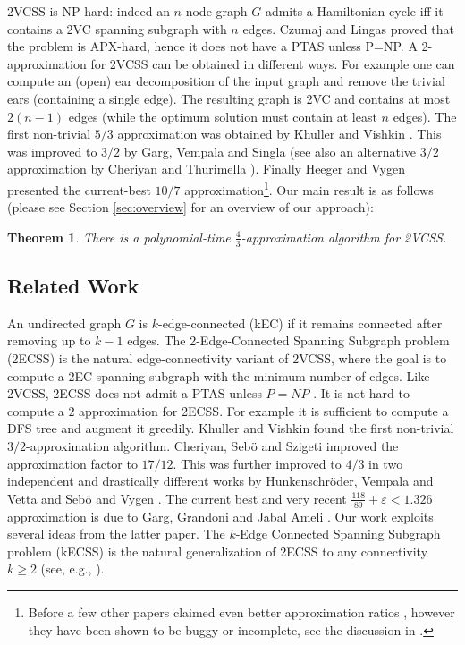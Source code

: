 \documentclass{article}
\newtheorem{theorem}{Theorem}\newtheorem{lemma}[theorem]{Lemma}\newtheorem{proposition}[theorem]{Proposition}\newtheorem{corollary}[theorem]{Corollary}\newtheorem{definition}[theorem]{Definition}\newtheorem{claim}[theorem]{Claim}\newtheorem{remark}[theorem]{Remark}\newtheorem{observation}[theorem]{Observation}\newtheorem{conjecture}[theorem]{Conjecture}\newtheorem{example}[theorem]{Example}
\newcommand{\eps}{\varepsilon}
\begin{document}
2VCSS is NP-hard: indeed an $n$-node graph $G$ admits a Hamiltonian cycle iff it contains a 2VC spanning subgraph with $n$ edges. Czumaj and Lingas \cite{CL99} proved that the problem is APX-hard, hence it does not have a PTAS unless P=NP. A 2-approximation for 2VCSS can be obtained in different ways. For example one can compute an (open) ear decomposition of the input graph and remove the trivial ears (containing a single edge). The resulting graph is 2VC and contains at most $2(n-1)$ edges (while the optimum solution must contain at least $n$ edges). 
The first non-trivial $5/3$ approximation was obtained by Khuller and Vishkin \cite{KV94}. This was improved to $3/2$ by Garg, Vempala and Singla \cite{GVS93} (see also an alternative $3/2$ approximation by Cheriyan and Thurimella \cite{CT00}). Finally Heeger and Vygen \cite{HV17} presented the current-best $10/7$ approximation\footnote{Before \cite{HV17} a few other papers claimed even better approximation ratios \cite{GR05,JRV03}, however they have been shown to be buggy or incomplete, see the discussion in \cite{HV17}.}. Our main result is as follows (please see Section \ref{sec:overview} for an overview of our approach):   
\begin{theorem}\label{thm:mainTheorem}
There is a polynomial-time $\frac{4}{3}$-approximation algorithm for 2VCSS.    
\end{theorem}

\subsection{Related Work}

An undirected graph $G$ is $k$-edge-connected (kEC) if it remains connected after removing up to $k-1$ edges. The 2-Edge-Connected Spanning Subgraph problem (2ECSS) is the natural edge-connectivity variant of 2VCSS, where the goal is to compute a 2EC spanning subgraph with the minimum number of edges. Like 2VCSS, 2ECSS does not admit a PTAS unless $P=NP$ \cite{CL99}. It is not hard to compute a $2$ approximation for 2ECSS. For example it is sufficient to compute a DFS tree and augment it greedily. Khuller and Vishkin \cite{KV92} found the first non-trivial $3/2$-approximation algorithm. Cheriyan, Seb{\"{o}} and Szigeti \cite{CSS01} improved the approximation factor to $17/12$. This was further improved to $4/3$ in two independent and drastically different works by Hunkenschr{\"o}der, Vempala and Vetta \cite{HVV19} and Seb{\"o} and Vygen \cite{SV14}. The current best and very recent $\frac{118}{89}+\eps<1.326$ approximation is due to Garg, Grandoni and Jabal Ameli \cite{GGJ23}. Our work exploits several ideas from the latter paper. The $k$-Edge Connected Spanning Subgraph problem (kECSS) is the natural generalization of 2ECSS to any connectivity $k\geq 2$ (see, e.g., \cite{CT00,GG12}).
\end{document}
